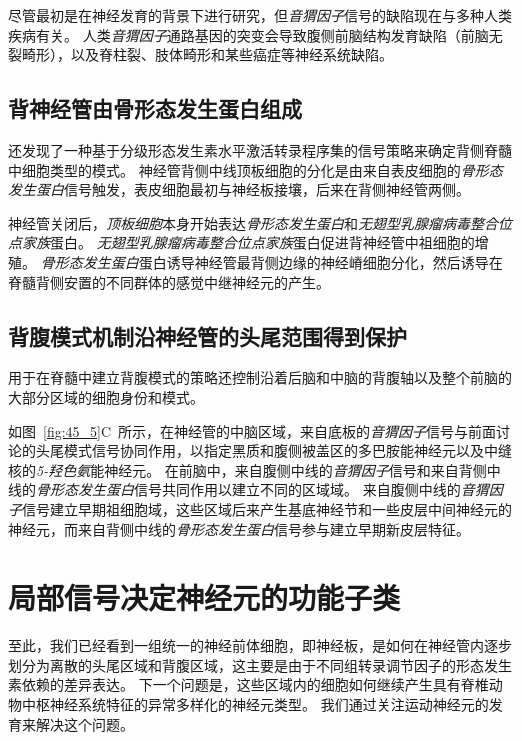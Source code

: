 尽管最初是在神经发育的背景下进行研究，但\textit{音猬因子}信号的缺陷现在与多种人类疾病有关。
人类\textit{音猬因子}通路基因的突变会导致腹侧前脑结构发育缺陷（前脑无裂畸形），以及脊柱裂、肢体畸形和某些癌症等神经系统缺陷。



\subsection{背神经管由骨形态发生蛋白组成}

还发现了一种基于分级形态发生素水平激活转录程序集的信号策略来确定背侧脊髓中细胞类型的模式。
神经管背侧中线顶板细胞的分化是由来自表皮细胞的\textit{骨形态发生蛋白}信号触发，表皮细胞最初与神经板接壤，后来在背侧神经管两侧。


神经管关闭后，\textit{顶板细胞}本身开始表达\textit{骨形态发生蛋白}和\textit{无翅型乳腺瘤病毒整合位点家族}蛋白。
\textit{无翅型乳腺瘤病毒整合位点家族}蛋白促进背神经管中祖细胞的增殖。
\textit{骨形态发生蛋白}蛋白诱导神经管最背侧边缘的神经嵴细胞分化，然后诱导在脊髓背侧安置的不同群体的感觉中继神经元的产生。



\subsection{背腹模式机制沿神经管的头尾范围得到保护}

用于在脊髓中建立背腹模式的策略还控制沿着后脑和中脑的背腹轴以及整个前脑的大部分区域的细胞身份和模式。


如图~\ref{fig:45_5}C~所示，在神经管的中脑区域，来自底板的\textit{音猬因子}信号与前面讨论的头尾模式信号协同作用，以指定黑质和腹侧被盖区的多巴胺能神经元以及中缝核的\textit{5-羟色氨}能神经元。
在前脑中，来自腹侧中线的\textit{音猬因子}信号和来自背侧中线的\textit{骨形态发生蛋白}信号共同作用以建立不同的区域域。
来自腹侧中线的\textit{音猬因子}信号建立早期祖细胞域，这些区域后来产生基底神经节和一些皮层中间神经元的神经元，而来自背侧中线的\textit{骨形态发生蛋白}信号参与建立早期新皮层特征。



\section{局部信号决定神经元的功能子类}

至此，我们已经看到一组统一的神经前体细胞，即神经板，是如何在神经管内逐步划分为离散的头尾区域和背腹区域，这主要是由于不同组转录调节因子的形态发生素依赖的差异表达。
下一个问题是，这些区域内的细胞如何继续产生具有脊椎动物中枢神经系统特征的异常多样化的神经元类型。
我们通过关注运动神经元的发育来解决这个问题。


